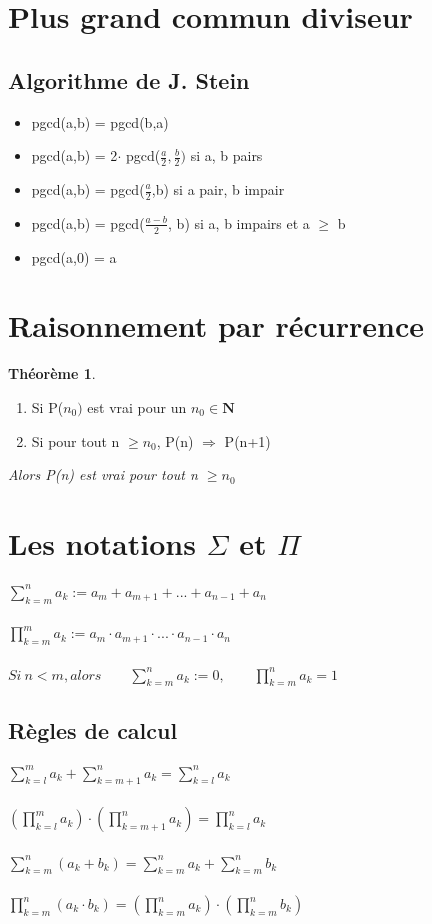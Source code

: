 \documentclass{article}
\newtheorem{theorem}{Théorème}
\begin{document}
\section{Plus grand commun diviseur}
\subsection{Algorithme de J. Stein}
\begin{itemize}
    \item pgcd(a,b) = pgcd(b,a)
    \item pgcd(a,b) = 2\(\cdot\) pgcd(\(\frac{a}{2},\frac{b}{2})\) \qquad si a, b pairs
    \item pgcd(a,b) = pgcd(\(\frac{a}{2}\),b) \qquad si a pair, b impair
    \item  pgcd(a,b) = pgcd(\(\frac{a-b}{2}\), b)  \qquad si a, b impairs et a \(\geq \) b
    \item pgcd(a,0) = a
\end{itemize}
\section{Raisonnement par récurrence}
\begin{theorem} 
\end{theorem}
\begin{enumerate} 
    \item Si P(\(n_0)\) est vrai pour un \(n_0 \in \mathbf{N}\)
    \item Si pour tout n \(\geq n_0\), P(n) \(\Rightarrow\) P(n+1)
\end{enumerate}
\qquad \textit{Alors P(n) est vrai pour tout n \(\geq n_0\)}
\section{Les notations \(\Sigma\) et \(\Pi\)}
\(\sum_{k=m}^n a_k := a_m + a_{m+1} + ... + a_{n-1} + a_n \) \\\\
\( \prod_{k=m}^{m} a_k := a_m \cdot a_{m+1} \cdot ... \cdot a_{n-1} \cdot a_n\)\\\\
\( Si\ n < m, alors \qquad \sum_{k=m}^{n} a_k := 0,\qquad \prod_{k=m}^{n} a_k = 1 \)
\subsection{Règles de calcul}
\( \sum_{k=l}^{m} a_k + \sum_{k=m+1}^{n} a_k = \sum_{k=l}^{n} a_k \)\\\\
\( (\prod_{k=l}^{m} a_k)\cdot(\prod_{k=m+1}^{n} a_k) =\prod_{k=l}^{n} a_k \)\\\\
\( \sum_{k=m}^{n}(a_k + b_k) = \sum_{k=m}^{n} a_k + \sum_{k=m}^{n} b_k \)\\\\
\( \prod_{k=m}^{n}(a_k \cdot b_k) = (\prod_{k=m}^{n} a_k) \cdot (\prod_{k=m}^{n} b_k)\)
\end{document}
